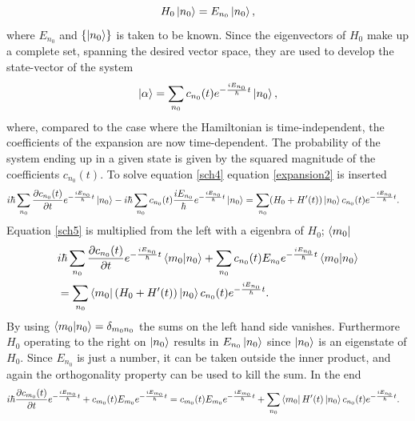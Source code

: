 \begin{equation}
	H_0\ket{n_0}=E_{n_0}\ket{n_0},
\end{equation}  
where $E_{n_0}$ and $\{\ket{n_0}\}$ is taken to be known. Since the eigenvectors of $H_0$ make up a complete set, spanning the desired vector space, they are used to develop the state-vector of the system
\begin{equation}
	\ket{\alpha}=\sum_{n_0}^{}c_{n_0}(t)e^{-\frac{iE_{n_0}}{\hbar}t}\ket{n_0},
	\label{expansion2}
\end{equation}  
where, compared to the case where the Hamiltonian is time-independent, the coefficients of the expansion are now time-dependent. The probability of the system ending up in a given state is given by the squared magnitude of the coefficients $c_{n_0}(t)$. To solve equation \eqref{sch4} equation \eqref{expansion2} is inserted
\begin{equation}
	\begin{split}
		&i\hbar\sum_{n_0}^{}\frac{\partial c_{n_0}(t)}{\partial t}e^{-\frac{iE_{n_0}}{\hbar}t}\ket{n_0}-i\hbar\sum_{n_0}^{}c_{n_0}(t)\frac{iE_{n_0}}{\hbar}e^{-\frac{iE_{n_0}}{\hbar}t}\ket{n_0}=\sum_{n_0}^{}(H_0+H'(t))\ket{n_0}c_{n_0}(t)e^{-\frac{iE_{n_0}}{\hbar}t}.
	\end{split}
	\label{sch5}
\end{equation} 
Equation \eqref{sch5} is multiplied from the left with a eigenbra of $H_0$; $\bra{m_{0}}$
\begin{equation}
	\begin{split}
		&	i\hbar\sum_{n_0}^{}\frac{\partial c_{n_0}(t)}{\partial t}e^{-\frac{iE_{n_0}}{\hbar}t}\braket{m_0|n_0}+\sum_{n_0}^{}c_{n_0}(t)E_{n_0}e^{-\frac{iE_{n_0}}{\hbar}t}\braket{m_0|n_0}\\
		&=\sum_{n_0}^{}\bra{m_0}(H_0+H'(t))\ket{n_0}c_{n_0}(t)e^{-\frac{iE_{n_0}}{\hbar}t}.
	\end{split}
	\label{sch6}
\end{equation} 
By using $\braket{m_0|n_0}=\delta_{m_0n_0}$ the sums on the left hand side vanishes. Furthermore $H_0$ operating to the right on $\ket{n_0}$  results in $E_{n_0}\ket{n_0}$ since $\ket{n_0}$ is an eigenstate of $H_0$. Since $E_{n_0}$ is just a number, it can be taken outside the inner product, and again the orthogonality property can be used to kill the sum. In the end
\begin{equation}
	\begin{split}
		&	i\hbar\frac{\partial c_{m_0}(t)}{\partial t}e^{-\frac{iE_{m_0}}{\hbar}t}+c_{m_0}(t)E_{m_0}e^{-\frac{iE_{m_0}}{\hbar}t}=c_{m_0}(t)E_{m_0}e^{-\frac{iE_{m_0}}{\hbar}t}+\sum_{n_0}^{}\bra{m_0}H'(t)\ket{n_0}c_{n_0}(t)e^{-\frac{iE_{n_0}}{\hbar}t}.
	\end{split}
	\label{sch7}
\end{equation} 
